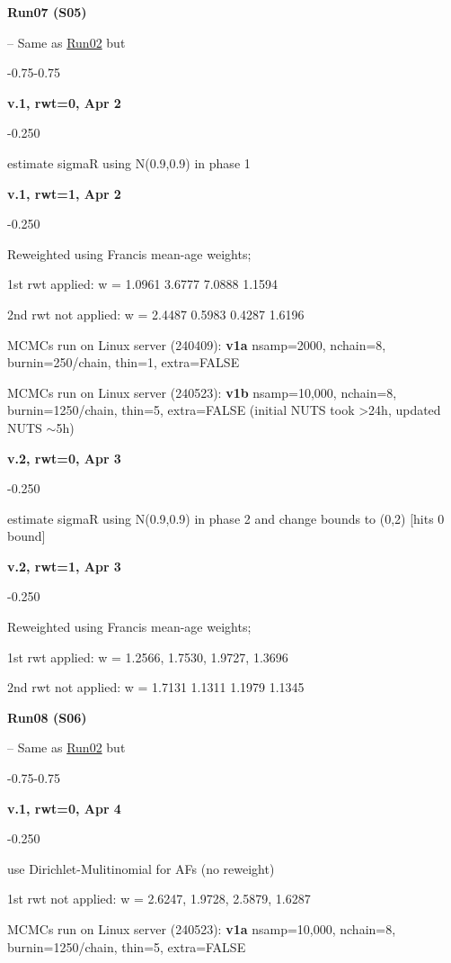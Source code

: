 \hypertarget{R07}{\textbf{Run07 (S05)}} -- Same as \hyperlink{R02}{Run02} but
\begin{itemize_csas}{-0.75}{-0.75}
	\item \textbf{v.1, rwt=0, Apr 2}
	\begin{itemize_csas}{-0.25}{0}
		\item estimate sigmaR using N(0.9,0.9) in phase 1
	\end{itemize_csas}
	\item \textbf{v.1, rwt=1, Apr 2}
	\begin{itemize_csas}{-0.25}{0}
		\item Reweighted using Francis mean-age weights;
		\item 1st rwt applied: w = 1.0961  3.6777  7.0888  1.1594
		\item 2nd rwt not applied: w = 2.4487  0.5983  0.4287  1.6196
		\item MCMCs run on Linux server (240409): \textbf{v1a} nsamp=2000, nchain=8, burnin=250/chain, thin=1, extra=FALSE
		\item MCMCs run on Linux server (240523): \textbf{v1b} nsamp=10,000, nchain=8, burnin=1250/chain, thin=5, extra=FALSE (initial NUTS took >24h, updated NUTS $\sim$5h)
	\end{itemize_csas}
	\item \textbf{v.2, rwt=0, Apr 3}
	\begin{itemize_csas}{-0.25}{0}
		\item estimate sigmaR using N(0.9,0.9) in phase 2 and change bounds to (0,2) [hits 0 bound]
	\end{itemize_csas}
	\item \textbf{v.2, rwt=1, Apr 3}
	\begin{itemize_csas}{-0.25}{0}
		\item Reweighted using Francis mean-age weights;
		\item 1st rwt applied: w = 1.2566, 1.7530, 1.9727, 1.3696
		\item 2nd rwt not applied: w = 1.7131  1.1311  1.1979  1.1345 
	\end{itemize_csas}
\end{itemize_csas}

\hypertarget{R08}{\textbf{Run08 (S06)}} -- Same as \hyperlink{R02}{Run02} but
\begin{itemize_csas}{-0.75}{-0.75}
	\item \textbf{v.1, rwt=0, Apr 4}
	\begin{itemize_csas}{-0.25}{0}
		\item use Dirichlet-Mulitinomial for AFs (no reweight)
		\item 1st rwt not applied: w = 2.6247, 1.9728, 2.5879, 1.6287 
		\item MCMCs run on Linux server (240523): \textbf{v1a} nsamp=10,000, nchain=8, burnin=1250/chain, thin=5, extra=FALSE
	\end{itemize_csas}
\end{itemize_csas}

